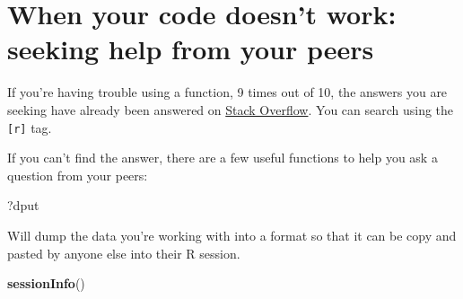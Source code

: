 \documentclass[]{book}
\newenvironment{Shaded}{\begin{snugshade}}{\end{snugshade}}
\newcommand{\KeywordTok}[1]{\textcolor[rgb]{0.13,0.29,0.53}{\textbf{#1}}}
\newcommand{\NormalTok}[1]{#1}
\begin{document}
\section{When your code doesn't work: seeking help from your
peers}\label{when-your-code-doesnt-work-seeking-help-from-your-peers}

If you're having trouble using a function, 9 times out of 10, the
answers you are seeking have already been answered on
\href{http://stackoverflow.com/}{Stack Overflow}. You can search using
the \texttt{{[}r{]}} tag.

If you can't find the answer, there are a few useful functions to help
you ask a question from your peers:

\begin{Shaded}
\begin{Highlighting}[]
\NormalTok{?dput}
\end{Highlighting}
\end{Shaded}

Will dump the data you're working with into a format so that it can be
copy and pasted by anyone else into their R session.

\begin{Shaded}
\begin{Highlighting}[]
\KeywordTok{sessionInfo}\NormalTok{()}
\end{Highlighting}
\end{Shaded}
\end{document}
